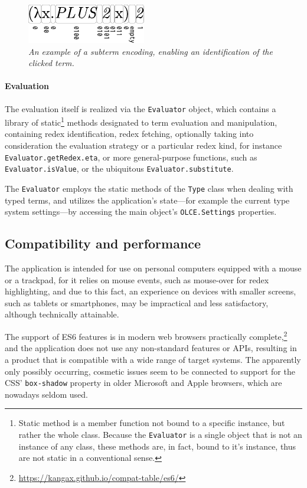 \documentclass[table, a4paper, 10pt]{article}
\begin{document}
\begin{figure}[H]\centering
\includegraphics[scale=1.63]{encoding.pdf}
\caption{\textit{An example of a subterm encoding, enabling an identification of the clicked term.}}\label{encoding}
\end{figure}

\paragraph{Evaluation}
The evaluation itself is realized via the \texttt{Evaluator} object, which contains a library of
static\footnote{Static method is a member function not bound to a specific instance, but rather the whole class. Because
the \texttt{Evaluator} is a single object that is not an instance of any class, these methods are, in fact, bound to it's instance, thus are not
static in a conventional sense.} methods designated to term evaluation and manipulation,
containing redex identification, redex fetching, optionally taking into consideration
the evaluation strategy or a particular redex kind, for
instance \texttt{Evaluator.getRedex.eta}, or more general-purpose
functions, such as \texttt{Evaluator.isValue}, or the ubiquitous \texttt{Evaluator.substitute}.

The \texttt{Evaluator} employs the static methods of the \texttt{Type} class when dealing
with typed terms, and utilizes the application's
state---for example the current type system settings---by accessing
the main object's \texttt{OLCE.Settings} properties.

\subsection{Compatibility and performance}
The application is intended for use on personal computers equipped with a mouse
or a trackpad, for it relies on mouse events, such as mouse-over for redex highlighting,
and due to this fact, an experience on devices with smaller
screens, such as tablets or smartphones,
may be impractical and less satisfactory, although technically attainable.

The support of ES6 features is in modern web browsers practically complete,\footnote{\url{https://kangax.github.io/compat-table/es6/}}
and the application
does not use any non-standard features or APIs,
resulting in a product that is compatible with a wide range of target systems.
The apparently only possibly occurring, cosmetic issues seem to be connected to
support for the CSS' \texttt{box-shadow} property in older Microsoft and Apple browsers,
which are nowadays seldom used.
\end{document}
